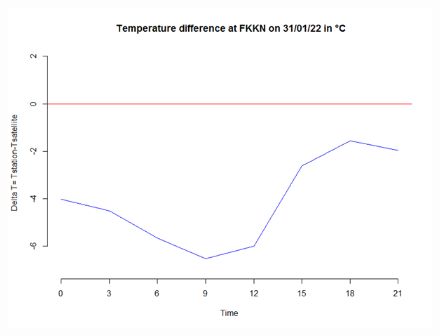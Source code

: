 \begin{figure}[H]
\begin{center}
\includegraphics[scale=0.6]{fkkn1.png} %
\end{center}
\end{figure}




